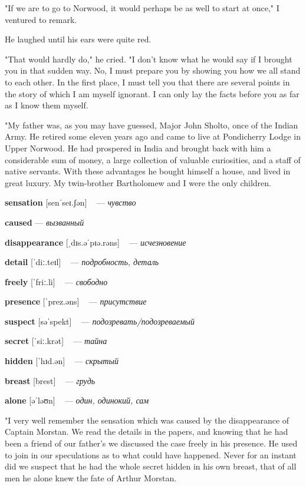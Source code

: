 \documentclass[a4paper,oneside,12pt]{amsart}
\begin{document}
{"If we are to go to Norwood, it would perhaps be as well to start at once," I ventured to remark.

He laughed until his ears were quite red.

"That would hardly do," he cried. "I don't know what he would say if I brought you in that sudden way. No, I must prepare you by showing you how we all stand to each other. In the first place, I must tell you that there are several points in the story of which I am myself ignorant. I can only lay the facts before you as far as I know them myself.

"My father was, as you may have guessed, Major John Sholto, once of the Indian Army. He retired some eleven years ago and came to live at Pondicherry Lodge in Upper Norwood. He had prospered in India and brought back with him a considerable sum of money, a large collection of valuable curiosities, and a staff of native servants. With these advantages he bought himself a house, and lived in great luxury. My twin-brother Bartholomew and I were the only children.
\\ } 

{\large 

 {\bf sensation } [senˈseɪ.ʃən] ~ --- \emph{ чувство }

{\bf caused } --- \emph{ вызванный }

{\bf disappearance } [ˌdɪs.əˈpɪə.rəns] ~ --- \emph{ исчезновение }

{\bf detail } [ˈdiː.teɪl] ~ --- \emph{ подробность, деталь }

{\bf freely } [ˈfriː.li] ~ --- \emph{ свободно }

{\bf presence } [ˈprez.əns] ~ --- \emph{ присутствие }

{\bf suspect } [səˈspekt] ~ --- \emph{ подозревать/подозреваемый }

{\bf secret } [ˈsiː.krət] ~ --- \emph{ тайна }

{\bf hidden } [ˈhɪd.ən] ~ --- \emph{ скрытый }

{\bf breast } [brest] ~ --- \emph{ грудь }

{\bf alone } [əˈləʊn] ~ --- \emph{ один, одинокий, сам }

} \vspace{6mm} {\Large 

 
"I very well remember the sensation which was caused by the disappearance of Captain Morstan. We read the details in the papers, and knowing that he had been a friend of our father's we discussed the case freely in his presence. He used to join in our speculations as to what could have happened. Never for an instant did we suspect that he had the whole secret hidden in his own breast, that of all men he alone knew the fate of Arthur Morstan.
\\ } 
\end{document}
